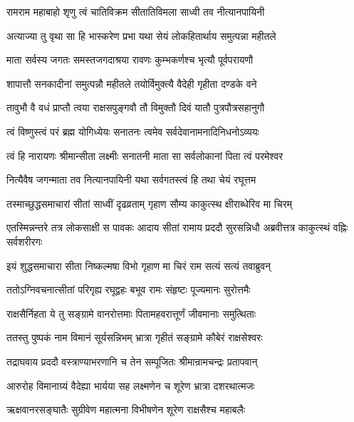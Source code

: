\twolineshloka
{रामराम महाबाहो शृणु त्वं चातिविक्रम}
{सीतातिविमला साध्वी तव नीत्यानपायिनी}%

\twolineshloka
{अत्याज्या तु वृथा सा हि भास्करेण प्रभा यथा}
{सेयं लोकहितार्थाय समुत्पन्ना महीतले}%

\twolineshloka
{माता सर्वस्य जगतः समस्तजगदाश्रया}
{रावणः कुम्भकर्णश्च भृत्यौ पूर्वपरायणौ}%

\twolineshloka
{शापात्तौ सनकादीनां समुत्पन्नौ महीतले}
{तयोर्विमुक्त्यै वैदेही गृहीता दण्डके वने}%

\twolineshloka
{तावुभौ वै वधं प्राप्तौ त्वया राक्षसपुङ्गवौ}
{तौ विमुक्तौ दिवं यातौ पुत्रपौत्रसहानुगौ}%

\twolineshloka
{त्वं विष्णुस्त्वं परं ब्रह्म योगिध्येयः सनातनः}
{त्वमेव सर्वदेवानामनादिनिधनोऽव्ययः}%

\twolineshloka
{त्वं हि नारायणः श्रीमान्सीता लक्ष्मीः सनातनी}
{माता सा सर्वलोकानां पिता त्वं परमेश्वर}%

\twolineshloka
{नित्यैवैष जगन्माता तव नित्यानपायिनी}
{यथा सर्वगतस्त्वं हि तथा चेयं रघूत्तम}%

\twolineshloka
{तस्माच्छुद्धसमाचारां सीतां साध्वीं दृढव्रताम्}
{गृहाण सौम्य काकुत्स्थ क्षीराब्धेरिव मा चिरम्}%



\threelineshloka
{एतस्मिन्नन्तरे तत्र लोकसाक्षी स पावकः}
{आदाय सीतां रामाय प्रददौ सुरसन्निधौ}
{अब्रवीत्तत्र काकुत्स्थं वह्निः सर्वशरीरगः}%


\twolineshloka
{इयं शुद्धसमाचारा सीता निष्कल्मषा विभो}
{गृहाण मा चिरं राम सत्यं सत्यं तवाब्रुवन्}%


\twolineshloka
{ततोऽग्निवचनात्सीतां परिगृह्य रघूद्वहः}
{बभूव रामः संहृष्टः पूज्यमानः सुरोत्तमैः}%

\twolineshloka
{राक्षसैर्निहता ये तु सङ्ग्रामे वानरोत्तमाः}
{पितामहवरात्तूर्णं जीवमानाः समुत्थिताः}%

\twolineshloka
{ततस्तु पुष्पकं नाम विमानं सूर्यसन्निभम्}
{भ्रात्रा गृहीतं सङ्ग्रामे कौबेरं राक्षसेश्वरः}%

\twolineshloka
{तद्राघवाय प्रददौ वस्त्राण्याभरणानि च}
{तेन सम्पूजितः श्रीमान्रामचन्द्रः प्रतापवान्}%

\twolineshloka
{आरुरोह विमानाग्र्यं वैदेह्या भार्यया सह}
{लक्ष्मणेन च शूरेण भ्रात्रा दशरथात्मजः}%

\twolineshloka
{ऋक्षवानरसङ्घातैः सुग्रीवेण महात्मना}
{विभीषणेन शूरेण राक्षसैश्च महाबलैः}%


